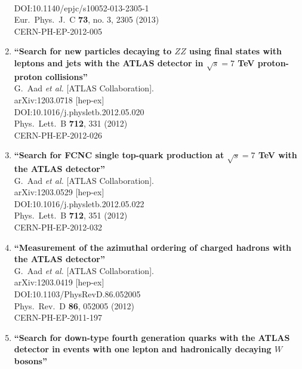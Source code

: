 \documentclass{article}
\begin{document}
\begin{enumerate}
  \\{}DOI:10.1140/epjc/s10052-013-2305-1
  \\{}Eur.\ Phys.\ J.\ C {\bf 73}, no. 3, 2305 (2013)
  \\{}CERN-PH-EP-2012-005
\item%
{\bf ``Search for new particles decaying to $Z Z$ using final states with leptons and jets with the ATLAS detector in $\sqrt{s}=7$ TeV proton-proton collisions''}
  \\{}G.~Aad {\it et al.} [ATLAS Collaboration].
  \\{}arXiv:1203.0718 [hep-ex]
  \\{}DOI:10.1016/j.physletb.2012.05.020
  \\{}Phys.\ Lett.\ B {\bf 712}, 331 (2012)
  \\{}CERN-PH-EP-2012-026
\item%
{\bf ``Search for FCNC single top-quark production at $\sqrt{s}=7$ TeV with the ATLAS detector''}
  \\{}G.~Aad {\it et al.} [ATLAS Collaboration].
  \\{}arXiv:1203.0529 [hep-ex]
  \\{}DOI:10.1016/j.physletb.2012.05.022
  \\{}Phys.\ Lett.\ B {\bf 712}, 351 (2012)
  \\{}CERN-PH-EP-2012-032
\item%
{\bf ``Measurement of the azimuthal ordering of charged hadrons with the ATLAS detector''}
  \\{}G.~Aad {\it et al.} [ATLAS Collaboration].
  \\{}arXiv:1203.0419 [hep-ex]
  \\{}DOI:10.1103/PhysRevD.86.052005
  \\{}Phys.\ Rev.\ D {\bf 86}, 052005 (2012)
  \\{}CERN-PH-EP-2011-197
\item%
{\bf ``Search for down-type fourth generation quarks with the ATLAS detector in events with one lepton and hadronically decaying $W$ bosons''}

\end{enumerate}
\end{document}
